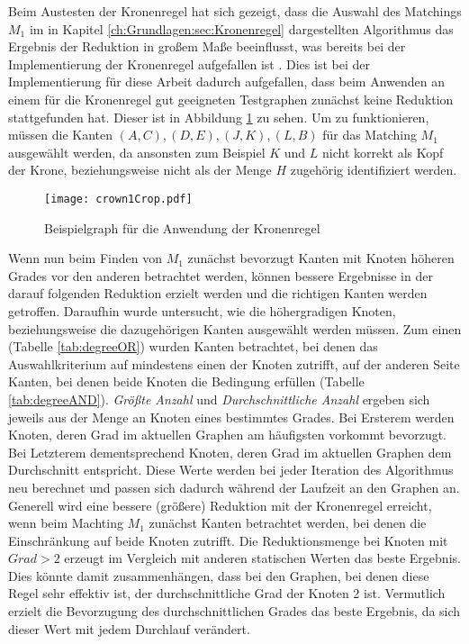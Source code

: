 Beim Austesten der Kronenregel hat sich gezeigt, dass die Auswahl des Matchings $M_{1}$ im in Kapitel \ref{ch:Grundlagen:sec:Kronenregel} dargestellten Algorithmus das Ergebnis der Reduktion in großem Maße beeinflusst, was bereits bei der Implementierung der Kronenregel aufgefallen ist \cite{paper:7}. Dies ist bei der Implementierung für diese Arbeit dadurch aufgefallen, dass beim Anwenden an einem für die Kronenregel gut geeigneten Testgraphen zunächst keine Reduktion stattgefunden hat. Dieser ist in Abbildung \ref{fig:crown1} zu sehen. Um zu funktionieren, müssen die Kanten $(A,C), (D,E), (J,K), (L,B)$ für das Matching $M_{1}$ ausgewählt werden, da ansonsten zum Beispiel $K$ und $L$ nicht korrekt als Kopf der Krone, beziehungsweise nicht als der Menge $H$ zugehörig identifiziert werden.
\begin{figure}[htb]
\centering
  	{\texttt{[image: crown1Crop.pdf]}}
	\caption{Beispielgraph für die Anwendung der Kronenregel\label{fig:crown1}}
\centering
\end{figure}
Wenn nun beim Finden von $M_{1}$ zunächst bevorzugt Kanten mit Knoten höheren Grades vor den anderen betrachtet werden, können bessere Ergebnisse in der darauf folgenden Reduktion erzielt werden und die richtigen Kanten werden getroffen. Daraufhin wurde untersucht, wie die höhergradigen Knoten, beziehungsweise die dazugehörigen Kanten ausgewählt werden müssen. Zum einen (Tabelle \ref{tab:degreeOR}) wurden Kanten betrachtet, bei denen das Auswahlkriterium auf mindestens einen der Knoten zutrifft, auf der anderen Seite Kanten, bei denen beide Knoten die Bedingung erfüllen (Tabelle \ref{tab:degreeAND}). \emph{Größte Anzahl} und \emph{Durchschnittliche Anzahl} ergeben sich jeweils aus der Menge an Knoten eines bestimmtes Grades. Bei Ersterem werden Knoten, deren Grad im aktuellen Graphen am häufigsten vorkommt bevorzugt. Bei Letzterem dementsprechend Knoten, deren Grad im aktuellen Graphen dem Durchschnitt entspricht. Diese Werte werden bei jeder Iteration des Algorithmus neu berechnet und passen sich dadurch während der Laufzeit an den Graphen an.\\ 
Generell wird eine bessere (größere) Reduktion mit der Kronenregel erreicht, wenn beim Machting $M_{1}$ zunächst Kanten betrachtet werden, bei denen die Einschränkung auf beide Knoten zutrifft. Die Reduktionsmenge bei Knoten mit $Grad>2$ erzeugt im Vergleich mit anderen statischen Werten das beste Ergebnis. Dies könnte damit zusammenhängen, dass bei den Graphen, bei denen diese Regel sehr effektiv ist, der durchschnittliche Grad der Knoten 2 ist. Vermutlich erzielt die Bevorzugung des durchschnittlichen Grades das beste Ergebnis, da sich dieser Wert mit jedem Durchlauf verändert.

